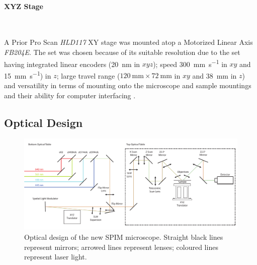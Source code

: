 \paragraph{XYZ Stage}~

A Prior Pro Scan \textit{HLD117} XY stage was mounted atop a Motorized Linear Axis \textit{FB204E}.
The set was chosen because of its suitable resolution due to the set having integrated linear encoders (\SI{20}{\nano\meter} in $xyz$); speed \SI{300}{\milli\meter\per\second} in $xy$ and \SI{15}{\milli\meter\per\second}) in $z$; large travel range ($\SI{120}{\milli\meter} \times \SI{72}{\milli\meter} $ in $xy$ and \SI{38}{\milli\meter} in $z$) and versatility in terms of mounting onto the microscope and sample mountings and their ability for computer interfacing \cite{Hu2014}.
%
%
\subsection{Optical Design}

\begin{landscape}
  \begin{figure}
  \centering
  \includegraphics[width=\linewidth]{Figures/opticaldesign}
  \caption[Full optical design of new SPIM]{Optical design of the new SPIM microscope.
  Straight black lines represent mirrors; arrowed lines represent lenses; coloured lines represent laser light.}
  \label{fig:opticaldesign}
  \end{figure}
\end{landscape}


